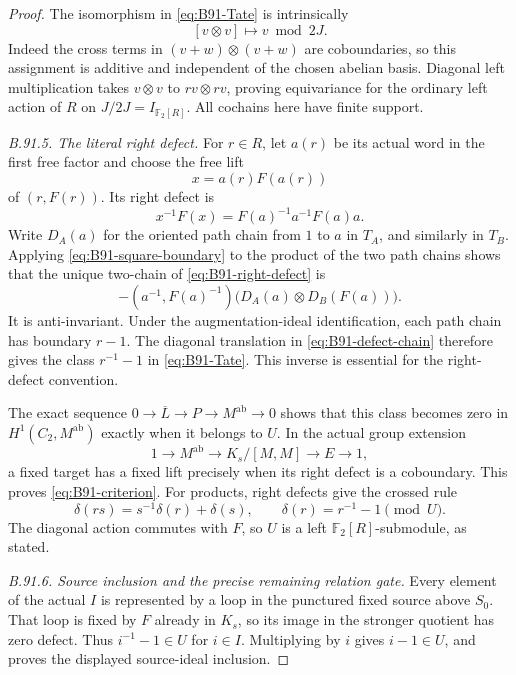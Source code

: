 \begin{proof}
The isomorphism in \eqref{eq:B91-Tate} is intrinsically
\[
          [v\otimes v]\longmapsto v\bmod 2J.
\]
Indeed the cross terms in $(v+w)\otimes(v+w)$ are coboundaries,
so this assignment is additive and independent of the chosen
abelian basis. Diagonal left multiplication takes
$v\otimes v$ to $rv\otimes rv$, proving equivariance for the
ordinary left action of $R$ on $J/2J=I_{\mathbb F_2[R]}$.
All cochains here have finite support.

\emph{B.91.5. The literal right defect.}
For $r\in R$, let $a(r)$ be its actual word in the first free
factor and choose the free lift
\[
             x=a(r)F(a(r))
\]
of $(r,F(r))$. Its right defect is
\begin{equation}\label{eq:B91-right-defect}
 x^{-1}F(x)=F(a)^{-1}a^{-1}F(a)a.
\end{equation}
Write $D_A(a)$ for the oriented path chain from $1$ to $a$ in
$T_A$, and similarly in $T_B$. Applying
\eqref{eq:B91-square-boundary} to the product of the two path chains
shows that the unique two-chain of
\eqref{eq:B91-right-defect} is
\begin{equation}\label{eq:B91-defect-chain}
 -(a^{-1},F(a)^{-1})
       \bigl(D_A(a)\otimes D_B(F(a))\bigr).
\end{equation}
It is anti-invariant. Under the augmentation-ideal identification,
each path chain has boundary $r-1$. The diagonal translation in
\eqref{eq:B91-defect-chain} therefore gives the class
$r^{-1}-1$ in \eqref{eq:B91-Tate}. This inverse is essential for
the right-defect convention.

The exact sequence
$0\to\overline L\to P\to M^{\mathrm{ab}}\to0$ shows that this
class becomes zero in $H^1(C_2,M^{\mathrm{ab}})$ exactly when it
belongs to $U$. In the actual group extension
\[
 1\longrightarrow M^{\mathrm{ab}}\longrightarrow K_s/[M,M]
                       \longrightarrow E\longrightarrow1,
\]
a fixed target has a fixed lift precisely when its right defect
is a coboundary. This proves \eqref{eq:B91-criterion}.
For products, right defects give the crossed rule
\[
 \delta(rs)=s^{-1}\delta(r)+\delta(s),\qquad
                      \delta(r)=r^{-1}-1\pmod U.
\]
The diagonal action commutes with $F$, so $U$ is a left
$\mathbb F_2[R]$-submodule, as stated.

\emph{B.91.6. Source inclusion and the precise remaining relation gate.}
Every element of the actual $I$ is represented by a loop in the
punctured fixed source above $S_0$. That loop is fixed by $F$
already in $K_s$, so its image in the stronger quotient has zero
defect. Thus $i^{-1}-1\in U$ for $i\in I$. Multiplying by $i$
gives $i-1\in U$, and proves the displayed source-ideal inclusion.


\end{proof}
